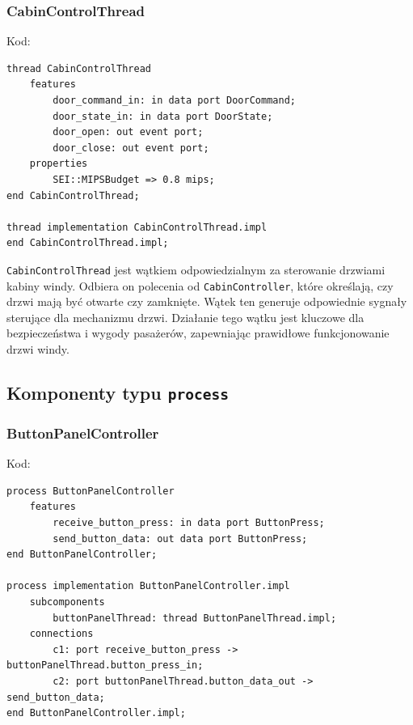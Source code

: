 \documentclass{article}
\begin{document}
    \newpage

    \subsubsection{CabinControlThread}

    Kod:
    
    \begin{lstlisting}[basicstyle=\ttfamily, keywordstyle=\bfseries]
thread CabinControlThread
    features
        door_command_in: in data port DoorCommand;
        door_state_in: in data port DoorState;
        door_open: out event port;
        door_close: out event port;
    properties
        SEI::MIPSBudget => 0.8 mips;
end CabinControlThread;

thread implementation CabinControlThread.impl
end CabinControlThread.impl;
    \end{lstlisting}

    \texttt{CabinControlThread} jest wątkiem odpowiedzialnym za sterowanie drzwiami kabiny windy. Odbiera on polecenia od \texttt{CabinController}, które określają, czy drzwi mają być otwarte czy zamknięte. Wątek ten generuje odpowiednie sygnały sterujące dla mechanizmu drzwi. Działanie tego wątku jest kluczowe dla bezpieczeństwa i wygody pasażerów, zapewniając prawidłowe funkcjonowanie drzwi windy.






    \subsection{Komponenty typu \texttt{process}}

    
    \subsubsection{ButtonPanelController}

    Kod:
    
    \begin{lstlisting}[basicstyle=\ttfamily, keywordstyle=\bfseries]
process ButtonPanelController
    features
        receive_button_press: in data port ButtonPress;
        send_button_data: out data port ButtonPress;
end ButtonPanelController;

process implementation ButtonPanelController.impl
    subcomponents
        buttonPanelThread: thread ButtonPanelThread.impl;
    connections
        c1: port receive_button_press -> buttonPanelThread.button_press_in;
        c2: port buttonPanelThread.button_data_out -> send_button_data;
end ButtonPanelController.impl;
    \end{lstlisting}
\end{document}
